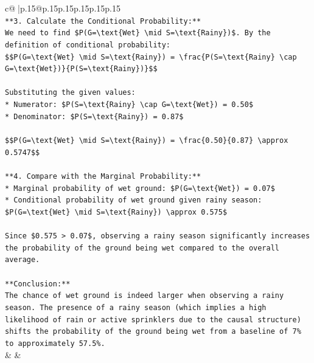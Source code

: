 \documentclass{article}
\begin{document}
{\begin{supertabular}{c@{$\;$}|p{.15\linewidth}@{}p{.15\linewidth}p{.15\linewidth}p{.15\linewidth}p{.15\linewidth}p{.15\linewidth}}
{{{\\ 
\texttt{**3. Calculate the Conditional Probability:**} \\
\texttt{We need to find \$P(G=\textbackslash{}text\{Wet\} \textbackslash{}mid S=\textbackslash{}text\{Rainy\})\$. By the definition of conditional probability:} \\
\texttt{\$\$P(G=\textbackslash{}text\{Wet\} \textbackslash{}mid S=\textbackslash{}text\{Rainy\}) = \textbackslash{}frac\{P(S=\textbackslash{}text\{Rainy\} \textbackslash{}cap G=\textbackslash{}text\{Wet\})\}\{P(S=\textbackslash{}text\{Rainy\})\}\$\$} \\
\\ 
\texttt{Substituting the given values:} \\
\texttt{*   Numerator: \$P(S=\textbackslash{}text\{Rainy\} \textbackslash{}cap G=\textbackslash{}text\{Wet\}) = 0.50\$} \\
\texttt{*   Denominator: \$P(S=\textbackslash{}text\{Rainy\}) = 0.87\$} \\
\\ 
\texttt{\$\$P(G=\textbackslash{}text\{Wet\} \textbackslash{}mid S=\textbackslash{}text\{Rainy\}) = \textbackslash{}frac\{0.50\}\{0.87\} \textbackslash{}approx 0.5747\$\$} \\
\\ 
\texttt{**4. Compare with the Marginal Probability:**} \\
\texttt{*   Marginal probability of wet ground: \$P(G=\textbackslash{}text\{Wet\}) = 0.07\$} \\
\texttt{*   Conditional probability of wet ground given rainy season: \$P(G=\textbackslash{}text\{Wet\} \textbackslash{}mid S=\textbackslash{}text\{Rainy\}) \textbackslash{}approx 0.575\$} \\
\\ 
\texttt{Since \$0.575 > 0.07\$, observing a rainy season significantly increases the probability of the ground being wet compared to the overall average.} \\
\\ 
\texttt{**Conclusion:**} \\
\texttt{The chance of wet ground is indeed larger when observing a rainy season. The presence of a rainy season (which implies a high likelihood of rain or active sprinklers due to the causal structure) shifts the probability of the ground being wet from a baseline of 7\% to approximately 57.5\%.} \\
            }
        }
    }
    & & \\ \\


\end{supertabular}}
\end{document}
